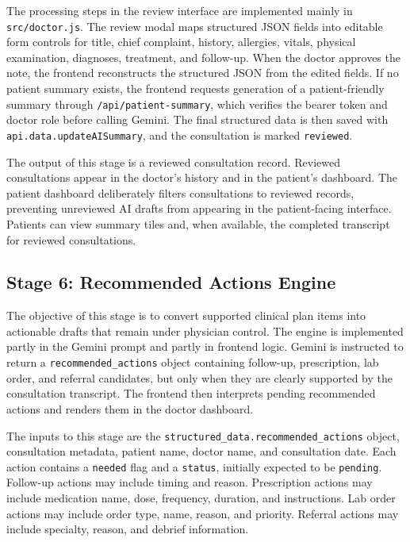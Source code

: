 The processing steps in the review interface are implemented mainly in \texttt{src/doctor.js}. The review modal maps structured JSON fields into editable form controls for title, chief complaint, history, allergies, vitals, physical examination, diagnoses, treatment, and follow-up. When the doctor approves the note, the frontend reconstructs the structured JSON from the edited fields. If no patient summary exists, the frontend requests generation of a patient-friendly summary through \texttt{/api/patient-summary}, which verifies the bearer token and doctor role before calling Gemini. The final structured data is then saved with \texttt{api.data.updateAISummary}, and the consultation is marked \texttt{reviewed}.

The output of this stage is a reviewed consultation record. Reviewed consultations appear in the doctor's history and in the patient's dashboard. The patient dashboard deliberately filters consultations to reviewed records, preventing unreviewed AI drafts from appearing in the patient-facing interface. Patients can view summary tiles and, when available, the completed transcript for reviewed consultations.

\subsection{Stage 6: Recommended Actions Engine}
\label{subsec:stage-recommended-actions}

The objective of this stage is to convert supported clinical plan items into actionable drafts that remain under physician control. The engine is implemented partly in the Gemini prompt and partly in frontend logic. Gemini is instructed to return a \texttt{recommended\_actions} object containing follow-up, prescription, lab order, and referral candidates, but only when they are clearly supported by the consultation transcript. The frontend then interprets pending recommended actions and renders them in the doctor dashboard.

The inputs to this stage are the \texttt{structured\_data.recommended\_actions} object, consultation metadata, patient name, doctor name, and consultation date. Each action contains a \texttt{needed} flag and a \texttt{status}, initially expected to be \texttt{pending}. Follow-up actions may include timing and reason. Prescription actions may include medication name, dose, frequency, duration, and instructions. Lab order actions may include order type, name, reason, and priority. Referral actions may include specialty, reason, and debrief information.


